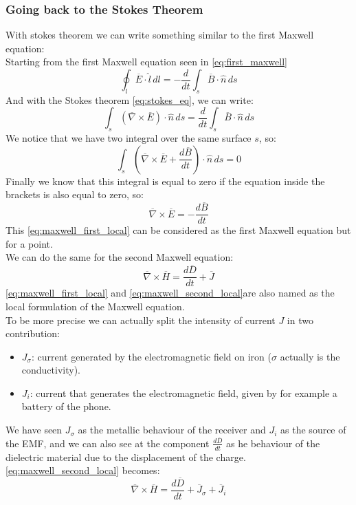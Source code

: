 \subsubsection*{Going back to the Stokes Theorem}
With stokes theorem we can write something similar to the first Maxwell equation:\\
Starting from the first Maxwell equation seen in \cref{eq:first_maxwell}
\begin{equation}
\oint_l \overline{E} \cdot \hat{l} \, dl = -\frac{d}{dt}\int_s \overline{B} \cdot \hat{n} \, ds
\end{equation} 
And with the Stokes theorem \cref{eq:stokes_eq}, we can write:
\begin{equation}
\int_s (\overline{\nabla} \times \overline{E})\cdot \hat{n}\,ds=\frac{d}{dt}\int_s \overline{B}\cdot\hat{n}\, ds
\end{equation}
We notice that we have two integral over the same surface $s$, so:
\begin{equation}
\int_s \left(\overline{\nabla}\times\overline{E}+\frac{d\overline{B}}{dt}\right)\cdot\hat{n}\,ds=0
\end{equation}
Finally we know that this integral is equal to zero if the equation inside the brackets is also equal to zero, so:
\begin{equation}\label{eq:maxwell_first_local}
\overline{\nabla}\times\overline{E}=-\frac{d\overline{B}}{dt}
\end{equation}
This \cref{eq:maxwell_first_local} can be considered as the first Maxwell equation but for a point.\\
We can do the same for the second Maxwell equation:
\begin{equation}\label{eq:maxwell_second_local}
\overline{\nabla}\times\overline{H}=\frac{d\overline{D}}{dt}+\overline{J}
\end{equation}
\cref{eq:maxwell_first_local} and \cref{eq:maxwell_second_local}are also named as the local formulation of the Maxwell equation.\\
To be more precise we can actually split the intensity of current $J$ in two contribution:
\begin{itemize}
\item $J_\sigma$: current generated by the electromagnetic field on iron ($\sigma$ actually is the conductivity).
\item $J_i$: current that generates the electromagnetic field, given by for example a battery of the phone.
\end{itemize}
We have seen $J_\sigma$ as the metallic behaviour of the receiver and $J_i$ as the source of the EMF, and we can also see at the component $\frac{d\overline{D}}{dt}$ as he behaviour of the dielectric material due to the displacement of the charge.\\
\cref{eq:maxwell_second_local} becomes:
\begin{equation}
\overline{\nabla}\times\overline{H}=\frac{d\overline{D}}{dt}+\overline{J}_\sigma+\overline{J}_i
\end{equation}
